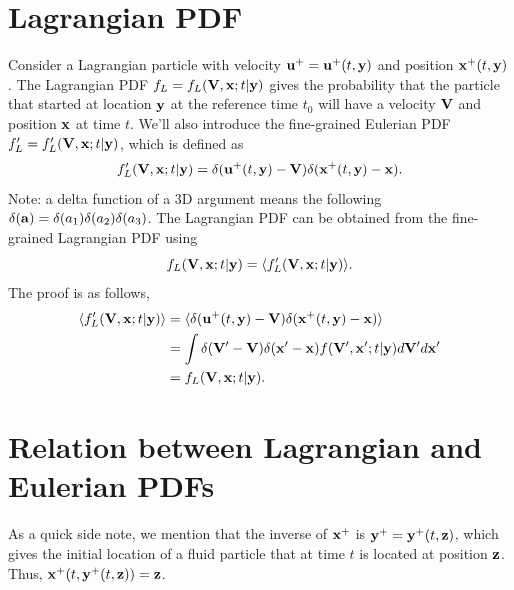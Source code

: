 \documentclass[a4paper,11pt]{report}
\begin{document}
\section{Lagrangian PDF}
Consider a Lagrangian particle with velocity $\mathbf{u}^+ = \mathbf{u}^+(t,\mathbf{y})$ and position $\mathbf{x}^+(t,\mathbf{y})$. The Lagrangian PDF $f_L = f_L(\mathbf{V}, \mathbf{x}; t | \mathbf{y})$ gives the probability that the particle that started at location $\mathbf{y}$ at the reference time $t_0$ will have a velocity $\mathbf{V}$ and position $\mathbf{x}$ at time $t$. We'll also introduce the fine-grained Eulerian PDF $f'_L = f'_L(\mathbf{V}, \mathbf{x}; t | \mathbf{y})$, which is defined as 
\begin{equation}
    f'_L(\mathbf{V}, \mathbf{x}; t | \mathbf{y}) = \delta(\mathbf{u}^+(t,\mathbf{y}) - \mathbf{V}) \delta(\mathbf{x}^+(t,\mathbf{y}) - \mathbf{x}).
\end{equation}
Note: a delta function of a 3D argument means the following $\delta(\mathbf{a}) = \delta(a_1) \delta(a_2) \delta(a_3) $. The Lagrangian PDF can be obtained from the fine-grained Lagrangian PDF using
\begin{equation}
    \label{eq:fine_lag_pdf}
    f_L(\mathbf{V}, \mathbf{x}; t | \mathbf{y}) = \langle f'_L(\mathbf{V}, \mathbf{x}; t | \mathbf{y}) \rangle.
\end{equation} 
The proof is as follows,
\begin{align}
    \langle f'_L(\mathbf{V}, \mathbf{x}; t | \mathbf{y}) \rangle &= \langle \delta( \mathbf{u}^+(t,\mathbf{y}) - \mathbf{V}) \delta(\mathbf{x}^+(t,\mathbf{y}) - \mathbf{x}) \rangle \nonumber \\
    &= \int \delta( \mathbf{V}' - \mathbf{V}) \delta ( \mathbf{x}' - \mathbf{x}) f(\mathbf{V}', \mathbf{x}';t | \mathbf{y}) d\mathbf{V}' d\mathbf{x}' \nonumber \\
    &= f_L(\mathbf{V}, \mathbf{x}; t | \mathbf{y}).
\end{align}

\section{Relation between Lagrangian and Eulerian PDFs}
As a quick side note, we mention that the inverse of $\mathbf{x}^+$ is $\mathbf{y}^+ = \mathbf{y}^+(t,\mathbf{z})$, which gives the initial location of a fluid particle that at time $t$ is located at position $\mathbf{z}$. Thus, $\mathbf{x}^+(t,\mathbf{y}^+(t,\mathbf{z})) = \mathbf{z}$.
\end{document}

